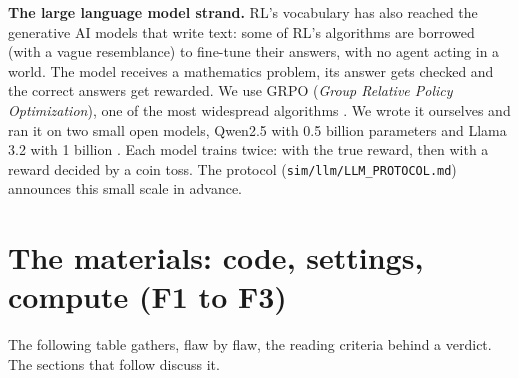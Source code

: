 \documentclass[11pt,a4paper]{article}
\begin{document}
\textbf{The large language model strand.} RL's vocabulary has also
reached the generative AI models that write text: some of RL's
algorithms are borrowed (with a vague resemblance) to fine-tune their
answers, with no agent acting in a world. The model receives a
mathematics problem, its answer gets checked and the correct answers get
rewarded. We use GRPO (\emph{Group Relative Policy Optimization}), one
of the most widespread algorithms \autocite{shao2024deepseekmath}. We
wrote it ourselves and ran it on two small open models, Qwen2.5 with 0.5
billion parameters \autocite{qwen2025qwen25} and Llama 3.2 with 1
billion \autocite{meta2024llama32,grattafiori2024llama3}. Each model
trains twice: with the true reward, then with a reward decided by a coin
toss. The protocol (\texttt{sim/llm/LLM\_PROTOCOL.md}) announces this
small scale in advance.

\section{The materials: code, settings, compute (F1 to
F3)}\label{the-materials-code-settings-compute-f1-to-f3}

The following table gathers, flaw by flaw, the reading criteria behind a
verdict. The sections that follow discuss it.
\end{document}
